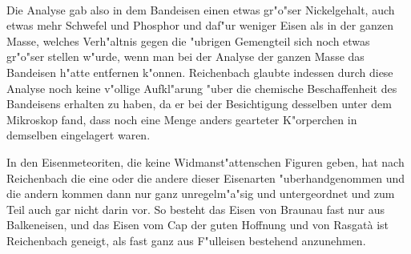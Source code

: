 \documentclass[a4paper, 11pt, oneside, german]{article}
\begin{document}
\paragraph{}
Die Analyse gab also in dem Bandeisen einen etwas gr"o"ser Nickelgehalt, auch etwas mehr Schwefel und Phosphor und daf"ur weniger Eisen als in der ganzen Masse, welches Verh"altnis gegen die "ubrigen Gemengteil sich noch etwas gr"o"ser stellen w"urde, wenn man bei der Analyse der ganzen Masse das Bandeisen h"atte entfernen k"onnen. Reichenbach glaubte indessen durch diese Analyse noch keine v"ollige Aufkl"arung "uber die chemische Beschaffenheit des Bandeisens erhalten zu haben, da er bei der Besichtigung desselben unter dem Mikroskop fand, dass noch eine Menge anders gearteter K"orperchen in demselben eingelagert waren.

In den Eisenmeteoriten, die keine Widmanst"attenschen Figuren geben, hat nach Reichenbach die eine oder die andere dieser Eisenarten "uberhandgenommen und die andern kommen dann nur ganz unregelm"a"sig und untergeordnet und zum Teil auch gar nicht darin vor. So besteht das Eisen von Braunau fast nur aus Balkeneisen, und das Eisen vom Cap der guten Hoffnung und von Rasgatà ist Reichenbach geneigt, als fast ganz aus F"ulleisen bestehend anzunehmen.
\end{document}
